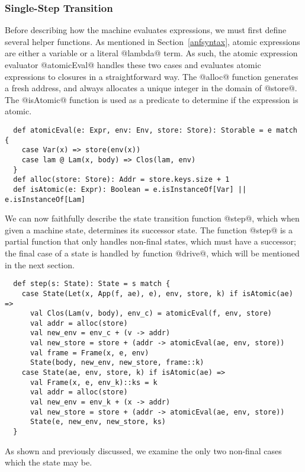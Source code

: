 \documentclass[acmsmall, review]{acmart}\settopmatter{}
\begin{document}
\subsubsection{Single-Step Transition}
Before describing how the machine evaluates expressions, we must first define several helper
functions. As mentioned in Section~\ref{anfsyntax}, atomic expressions are either a variable
or a literal @lambda@ term. As such, the atomic expression evaluator @atomicEval@ handles
these two cases and evaluates atomic expressions to closures in a straightforward way.
The @alloc@ function generates a fresh address, and always allocates a unique integer
in the domain of @store@.
The @isAtomic@ function is used as a predicate to determine if the expression is atomic.

\begin{lstlisting}
  def atomicEval(e: Expr, env: Env, store: Store): Storable = e match {
    case Var(x) => store(env(x))
    case lam @ Lam(x, body) => Clos(lam, env)
  }
  def alloc(store: Store): Addr = store.keys.size + 1
  def isAtomic(e: Expr): Boolean = e.isInstanceOf[Var] || e.isInstanceOf[Lam]
\end{lstlisting}

We can now faithfully describe the state transition function @step@,
which when given a machine state, determines its successor state.
The function @step@ is a partial function that only handles non-final states,
which must have a successor; the final case of a state is handled by function
@drive@, which will be mentioned in the next section.

\begin{lstlisting}
  def step(s: State): State = s match {
    case State(Let(x, App(f, ae), e), env, store, k) if isAtomic(ae) =>
      val Clos(Lam(v, body), env_c) = atomicEval(f, env, store)
      val addr = alloc(store)
      val new_env = env_c + (v -> addr)
      val new_store = store + (addr -> atomicEval(ae, env, store))
      val frame = Frame(x, e, env)
      State(body, new_env, new_store, frame::k)
    case State(ae, env, store, k) if isAtomic(ae) =>
      val Frame(x, e, env_k)::ks = k
      val addr = alloc(store)
      val new_env = env_k + (x -> addr)
      val new_store = store + (addr -> atomicEval(ae, env, store))
      State(e, new_env, new_store, ks)
  }
\end{lstlisting}

As shown and previously discussed, we examine the only two non-final cases which the state
may be.
\end{document}
